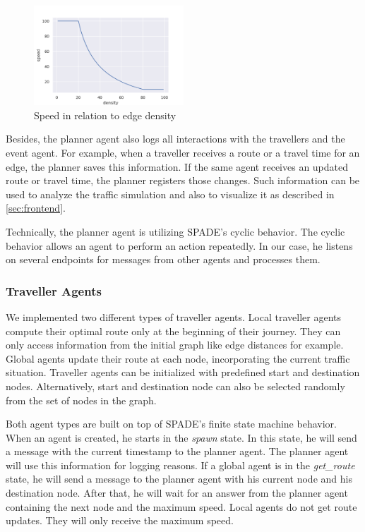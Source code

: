 \begin{figure}[h]
	\centering
	\includegraphics[width=0.5\textwidth]{images/speed.png}
	\caption{Speed in relation to edge density}
	\label{fig:speed_function}
\end{figure}

Besides, the planner agent also logs all interactions with the travellers and the event agent. For example, when a traveller receives a route or a travel time for an edge, the planner saves this information. If the same agent receives an updated route or travel time, the planner registers those changes. Such information can be used to analyze the traffic simulation and also to visualize it as described in \autoref{sec:frontend}.


Technically, the planner agent is utilizing SPADE's cyclic behavior. The cyclic behavior allows an agent to perform an action repeatedly.  In our case, he listens on several endpoints for messages from other agents and processes them.

\subsubsection{Traveller Agents}\label{subsubsec:traveller}
We implemented two different types of traveller agents. Local traveller agents compute their optimal route only at the beginning of their journey. They can only access information from the initial graph like edge distances for example.  
Global agents update their route at each node, incorporating the current traffic situation. 
Traveller agents can be initialized with predefined start and destination nodes. Alternatively, start and destination node can also be selected randomly from the set of nodes in the graph.

Both agent types are built on top of SPADE's finite state machine behavior. When an agent is created, he starts in the \textit{spawn} state. In this state, he will send a message with the current timestamp to the planner agent. The planner agent will use this information for logging reasons. 
If a global agent is in the \textit{get\_route} state, he will send a message to the planner agent with his current node and his destination node. After that, he will wait for an answer from the planner agent containing the next node and the maximum speed. Local agents do not get route updates. They will only receive the maximum speed. 

